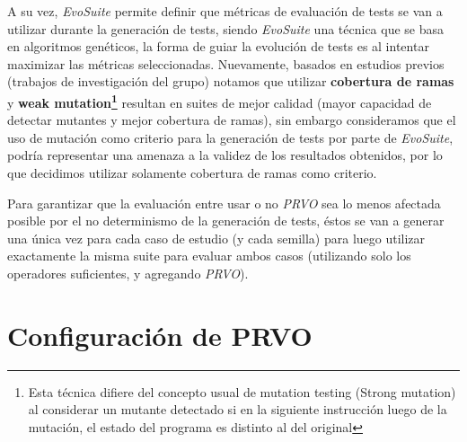 A su vez, \emph{EvoSuite} permite definir que m\'etricas de evaluaci\'on de tests se van a utilizar durante la generaci\'on de tests, siendo \emph{EvoSuite} una t\'ecnica que se basa en algoritmos gen\'eticos, la forma de guiar la evoluci\'on de tests es al intentar maximizar las m\'etricas seleccionadas. Nuevamente, basados en estudios previos (trabajos de investigaci\'on del grupo) notamos que utilizar \textbf{cobertura de ramas} y \textbf{weak mutation\footnote{Esta t\'ecnica difiere del concepto usual de mutation testing (Strong mutation) al considerar un mutante detectado si en la siguiente instrucci\'on luego de la mutaci\'on, el estado del programa es distinto al del original}} resultan en suites de mejor calidad (mayor capacidad de detectar mutantes y mejor cobertura de ramas), sin embargo consideramos que el uso de mutaci\'on como criterio para la generaci\'on de tests por parte de \emph{EvoSuite}, podr\'ia representar una amenaza a la validez de los resultados obtenidos, por lo que decidimos utilizar solamente cobertura de ramas como criterio.

Para garantizar que la evaluaci\'on entre usar o no \emph{PRVO} sea lo menos afectada posible por el no determinismo de la generaci\'on de tests, \'estos se van a generar una \'unica vez para cada caso de estudio (y cada semilla) para luego utilizar exactamente la misma suite para evaluar ambos casos (utilizando solo los operadores suficientes, y agregando \emph{PRVO}).

\section{Configuraci\'on de PRVO}
\label{sec:evaluation.prvoconfig}

